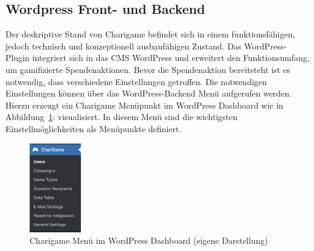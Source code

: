 \subsection{Wordpress Front- und Backend}
Der deskriptive Stand von Charigame befindet sich in einem funktionsfähigen, jedoch technisch und konzeptionell ausbaufähigen Zustand.
Das WordPress-Plugin integriert sich in das CMS WordPress und erweitert den Funktionsumfang, um gamifizierte Spendenaktionen.
Bevor die Spendenaktion bereitsteht ist es notwendig, dass verschiedene Einstellungen getroffen.
Die notwendigen Einstellungen können über das WordPress-Backend Menü aufgerufen werden.
\\
Hierzu erzeugt ein Charigame Menüpunkt im WordPress Dashboard wie in Abbildung~\ref{fig:charigame-menu-legacy}: visualisiert.
In diesem Menü sind die wichtigsten Einstellmöglichkeiten als Menüpunkte definiert.
\begin{figure}[tbh]
    \centering
    \includegraphics[width=0.2\textwidth]{images/legacy_charigame_wordpress_menu}
    \caption{Charigame Menü im WordPress Dashboard (eigene Darstellung)}
    \label{fig:charigame-menu-legacy}
\end{figure}

